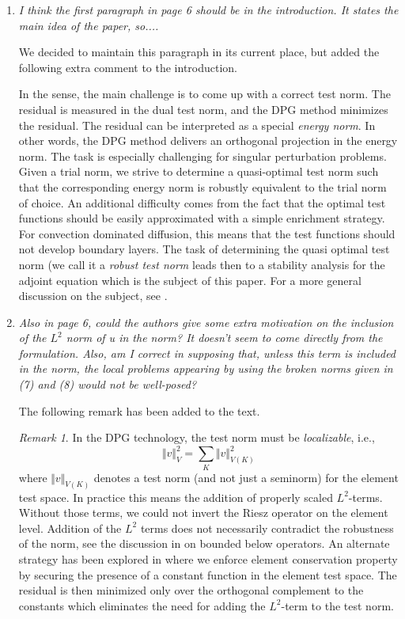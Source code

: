 \documentclass[11pt,c]{article}
\theoremstyle{remark}
\newtheorem*{remark}{Remark}
\begin{document}
\begin{enumerate}
  \item {\em I think the first paragraph in page 6 should be in the introduction. It states the main
idea of the paper, so....}

We decided to maintain this paragraph in its current place, but added the following extra
comment to the introduction.


In the sense, the main challenge is to come up with a correct test norm. The residual is measured
in the dual test norm, and the DPG method minimizes the residual. The residual can be interpreted
as a special {\em energy norm}. In other words, the DPG method delivers an orthogonal
projection in the energy norm. The task is especially challenging for singular perturbation
problems. Given a trial norm, we strive to determine a quasi-optimal test norm such that
the corresponding energy norm is robustly equivalent to the trial  norm of choice. An additional
difficulty comes from the fact that the optimal test functions should be easily approximated
with a simple enrichment strategy. For convection dominated diffusion, this means that
the test functions should not develop boundary layers. The task of determining the
quasi optimal test norm (we call it a {\em robust test norm} leads then to a stability analysis
for the adjoint equation which is the subject of this paper. For a more general discussion
on the subject, see \cite{DPGEncyclopedia}.




  \item {\em Also in page 6, could the authors give some extra motivation on the inclusion of the
$L^2$ norm of u in the norm? It doesn't seem to come directly from the formulation. Also,
am I correct in supposing that, unless this term is included in the norm, the local problems
appearing by using the broken norms given in (7) and (8) would not be well-posed?}

The following remark has been added to the text.

\begin{remark}
In the DPG technology, the test norm must be {\em localizable}, i.e.,
$$
\Vert v \Vert^2_{V} = \sum_{K} \Vert v \Vert^2_{V(K)}
$$
where $\Vert v \Vert_{V(K)}$ denotes a test norm (and not just a seminorm) for the
element test space. In practice this means the addition of properly scaled $L^2$-terms.
Without those terms, we could not invert the Riesz operator on the element level.
Addition of the $L^2$ terms does not necessarily contradict the robustness of the norm,
see the discussion in \cite{DPGEncyclopedia} on bounded below operators. An alternate
strategy has been explored in \cite{EllisLC} where we enforce element conservation
property 
by securing the presence of a constant function in the element test space. The residual
is then minimized only over the orthogonal complement to the constants which eliminates
the need for adding the $L^2$-term to the test norm.
\end{remark}



\end{enumerate}
\end{document}
